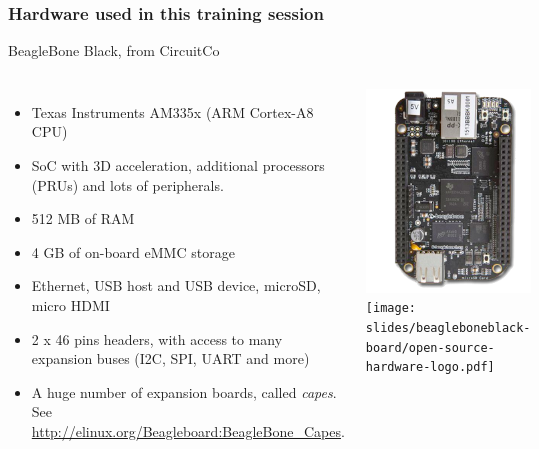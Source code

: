 \begin{frame}
\frametitle{Hardware used in this training session}
  BeagleBone Black, from CircuitCo
  \begin{columns}
    \footnotesize
    \begin{itemize}
      \item Texas Instruments AM335x (ARM Cortex-A8 CPU)
      \item SoC with 3D acceleration, additional processors
        (PRUs) and lots of peripherals.
      \item 512 MB of RAM
      \item 4 GB of on-board eMMC storage
      \item Ethernet, USB host and USB device, microSD, micro HDMI
      \item 2 x 46 pins headers, with access to many expansion buses
        (I2C, SPI, UART and more)
      \item A huge number of expansion boards, called {\em capes}.
        See \url{http://elinux.org/Beagleboard:BeagleBone_Capes}.
    \end{itemize}
    \begin{center}
      \includegraphics[width=\textwidth]{slides/beagleboneblack-board/beagleboneblack.png}\\
      \texttt{[image: slides/beagleboneblack-board/open-source-hardware-logo.pdf]}
    \end{center}
  \end{columns}
\end{frame}

